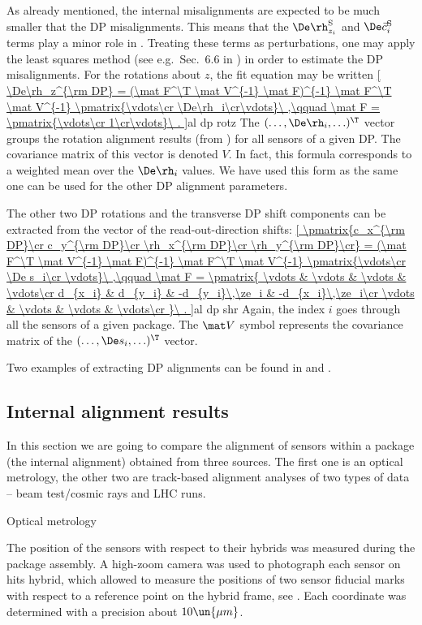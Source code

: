 As already mentioned, the internal misalignments are expected to be much smaller that the DP misalignments. This means that the $\De\rh_{z_i}^{\rm S}$ and $ \De\vec c_i^{\rm S}$ terms play a minor role in . Treating these terms as perturbations, one may apply the least squares method (see e.g.~Sec.~6.6 in ) in order to estimate the DP misalignments. For the rotations about $z$, the fit equation may be written
\eqref{
	\De\rh_z^{\rm DP} = (\mat F^\T \mat V^{-1} \mat F)^{-1} \mat F^\T \mat V^{-1} \pmatrix{\vdots\cr \De\rh_i\cr\vdots}\ ,\qquad
	\mat F = \pmatrix{\vdots\cr 1\cr\vdots}\ .
}{al dp rotz}
The $(\ldots, \De\rh_i, \ldots)^\T$ vector groups the rotation alignment results (from ) for all sensors of a given DP. The covariance matrix of this vector is denoted $V$. In fact, this formula corresponds to a weighted mean over the $\De\rh_i$ values. We have used this form as the same one can be used for the other DP alignment parameters.

The other two DP rotations and the transverse DP shift components can be extracted from the vector of the read-out-direction shifts:
\eqref{
	\pmatrix{c_x^{\rm DP}\cr c_y^{\rm DP}\cr \rh_x^{\rm DP}\cr \rh_y^{\rm DP}\cr} =
	(\mat F^\T \mat V^{-1} \mat F)^{-1} \mat F^\T \mat V^{-1}
	\pmatrix{\vdots\cr \De s_i\cr \vdots}\ ,\qquad
	\mat F = \pmatrix{
		\vdots & \vdots & \vdots & \vdots\cr
		d_{x_i} & d_{y_i} & -d_{y_i}\,\ze_i & -d_{x_i}\,\ze_i\cr
		\vdots & \vdots & \vdots & \vdots\cr
	}\ .
}{al dp shr}
Again, the index $i$ goes through all the sensors of a given package. The $\mat V$ symbol represents the covariance matrix of the $(\ldots, \De s _i, \ldots)^\T$ vector.

Two examples of extracting DP alignments can be found in  and .


\subsection[al int res]{Internal alignment results}

In this section we are going to compare the alignment of sensors within a package (the internal alignment) obtained from three sources. The first one is an optical metrology, the other two are track-based alignment analyses of two types of data -- beam test/cosmic rays and LHC runs.

\caption{Optical metrology}

The position of the sensors with respect to their hybrids was measured during the package assembly. A high-zoom camera was used to photograph each sensor on hits hybrid, which allowed to measure the positions of two sensor fiducial marks with respect to a reference point on the hybrid frame, see . Each coordinate was determined with a precision about $10\un{\mu m}$.

